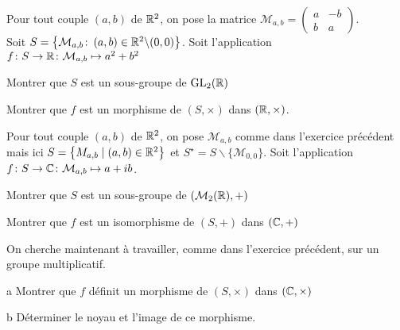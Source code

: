 \documentclass{report}
\begin{document}
\begin{exo}
    Pour tout couple \(\left(a,b\right)\) de \(\mathbb{R}^2\), on pose la matrice
    \(\mathcal{M}_{a,b}=\begin{pmatrix}a&-b\\b&a\end{pmatrix}\).\\ Soit \(S=
    \left\{ \mathcal{M}_{a,b}\colon \left(a,b\right)\in\mathbb{R}^2\backslash(0,0) \right\}\).
    Soit l'application \(f\colon S\to \mathbb{R}\colon \mathcal{M}_{a,b}\mapsto a^2+b^2\)
    \begin{q}{1}
        Montrer que \(S\) est un sous-groupe de \(\text{GL}_2(\mathbb{R})\)
    \end{q}
    \begin{q}{2}
        Montrer que \(f\) est un morphisme de \(\left(S,\times\right)\) dans \((\mathbb{R},\times)\).
    \end{q}
\end{exo}

\begin{exo}
    Pour tout couple \(\left(a,b\right)\) de \(\mathbb{R}^2\), on pose \(\mathcal{M}_{a,b}\)
    comme dans l'exercice précédent mais ici \(S=\left\{ M_{a,b}\mid \left(a,b\right)
    \in\mathbb{R}^2 \right\}\) et \(S^\star=S\backslash\{\mathcal{M}_{0,0}\}\). Soit l'application
    \(f\colon S\to\mathbb{C}\colon \mathcal{M}_{a,b}\mapsto a+ib\).
    \begin{q}{1}
        Montrer que \(S\) est un sous-groupe de \(\left(\mathcal{M}_2(\mathbb{R}), +\right)\)
    \end{q}
    \begin{q}{2}
        Montrer que \(f\) est un isomorphisme de \(\left(S,+\right)\) dans \(\left(\mathbb{C},+\right)\)
    \end{q}
    \begin{q}{3}
        On cherche maintenant à travailler, comme dans l'exercice précédent, sur un groupe
        multiplicatif.
        \begin{q}{a}
            Montrer que \(f\) définit un morphisme de \(\left(S,\times\right)\) dans
            \(\left(\mathbb{C},\times\right)\)
        \end{q}
        \begin{q}{b}
            Déterminer le noyau et l'image de ce morphisme.
        \end{q}
    \end{q}
\end{exo}
\end{document}
